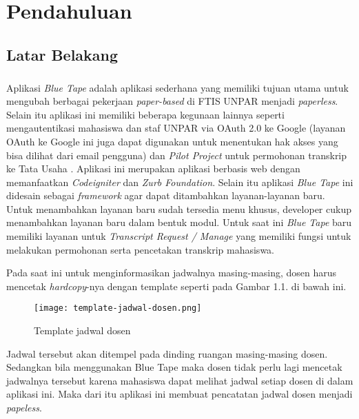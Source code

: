 \chapter{Pendahuluan}
\label{chap:intro}
   
\section{Latar Belakang}
\label{sec:label}

\paragraph{} Aplikasi \textit{Blue Tape} adalah aplikasi sederhana yang memiliki tujuan utama untuk mengubah berbagai pekerjaan \textit{paper-based} di FTIS UNPAR menjadi \textit{paperless}. Selain itu aplikasi ini memiliki beberapa kegunaan lainnya seperti mengautentikasi mahasiswa dan staf UNPAR via OAuth 2.0 ke Google (layanan OAuth ke Google ini juga dapat digunakan untuk menentukan hak akses yang bisa dilihat dari email pengguna) dan \textit{Pilot Project} untuk permohonan transkrip ke Tata Usaha . Aplikasi ini merupakan aplikasi berbasis web dengan memanfaatkan \textit{Codeigniter} dan \textit{Zurb Foundation}. Selain itu aplikasi \textit{Blue Tape} ini didesain sebagai \textit{framework} agar dapat ditambahkan layanan-layanan baru. Untuk menambahkan layanan baru sudah tersedia menu khusus, developer cukup menambahkan layanan baru dalam bentuk modul. Untuk saat ini \textit{Blue Tape} baru memiliki layanan untuk \textit{Transcript Request / Manage} yang memiliki fungsi untuk melakukan permohonan serta pencetakan transkrip mahasiswa.

Pada saat ini untuk menginformasikan jadwalnya masing-masing, dosen harus mencetak \textit{hardcopy}-nya dengan template seperti pada Gambar 1.1. di bawah ini.

\begin{figure} [h]
	\centering  
	\texttt{[image: template-jadwal-dosen.png]}  
	\caption[Template jadwal dosen]{Template jadwal dosen} 
	\label{fig:template-jadwal-dosen} 
\end{figure} 
Jadwal tersebut akan ditempel pada dinding ruangan masing-masing dosen. Sedangkan bila menggunakan Blue Tape maka dosen tidak perlu lagi mencetak jadwalnya tersebut karena mahasiswa dapat melihat jadwal setiap dosen di dalam aplikasi ini. Maka dari itu aplikasi ini membuat pencatatan jadwal dosen menjadi \textit{papeless}.

